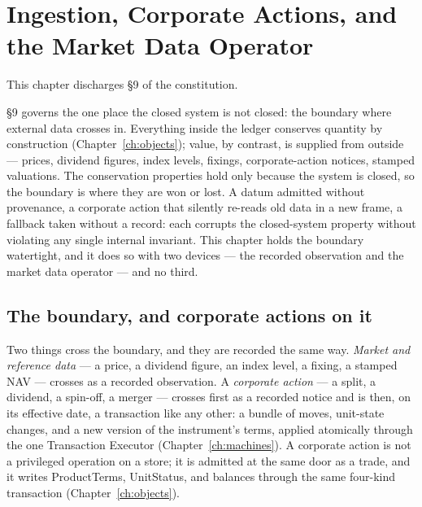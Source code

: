 \section{Ingestion, Corporate Actions, and the Market Data Operator}\label{ch:marketdata}

This chapter discharges \S 9 of the constitution.

\S 9 governs the one place the closed system is not closed: the boundary where external
data crosses in. Everything inside the ledger conserves quantity by construction
(Chapter~\ref{ch:objects}); value, by contrast, is supplied from outside --- prices,
dividend figures, index levels, fixings, corporate-action notices, stamped valuations.
The conservation properties hold only because the system is closed, so the boundary is
where they are won or lost. A datum admitted without provenance, a corporate action that
silently re-reads old data in a new frame, a fallback taken without a record: each
corrupts the closed-system property without violating any single internal invariant. This
chapter holds the boundary watertight, and it does so with two devices --- the recorded
observation and the market data operator --- and no third.

\subsection{The boundary, and corporate actions on it}

Two things cross the boundary, and they are recorded the same way. \emph{Market and
reference data} --- a price, a dividend figure, an index level, a fixing, a stamped NAV
--- crosses as a recorded observation. A \emph{corporate action} --- a split, a dividend,
a spin-off, a merger --- crosses first as a recorded notice and is then, on its effective
date, a transaction like any other: a bundle of moves, unit-state changes, and a new
version of the instrument's terms, applied atomically through the one Transaction Executor
(Chapter~\ref{ch:machines}). A corporate action is not a privileged operation on a store;
it is admitted at the same door as a trade, and it writes ProductTerms, UnitStatus, and
balances through the same four-kind transaction (Chapter~\ref{ch:objects}).

